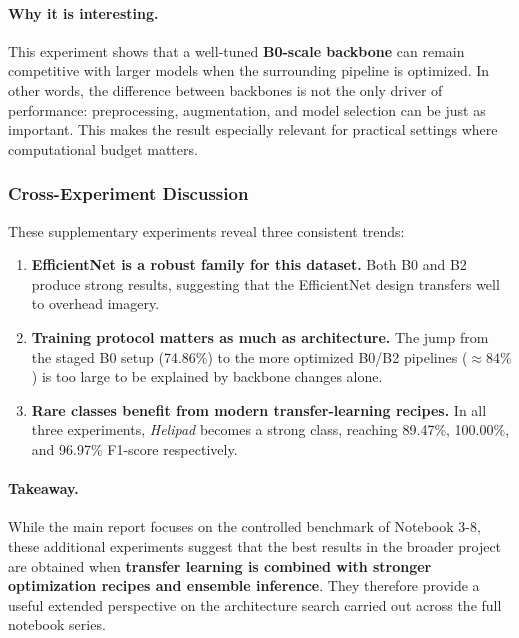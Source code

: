 \paragraph{Why it is interesting.} This experiment shows that a well-tuned \textbf{B0-scale backbone} can remain competitive with larger models when the surrounding pipeline is optimized. In other words, the difference between backbones is not the only driver of performance: preprocessing, augmentation, and model selection can be just as important. This makes the result especially relevant for practical settings where computational budget matters.

\subsubsection{Cross-Experiment Discussion}

These supplementary experiments reveal three consistent trends:
\begin{enumerate}
    \item \textbf{EfficientNet is a robust family for this dataset.} Both B0 and B2 produce strong results, suggesting that the EfficientNet design transfers well to overhead imagery.
    \item \textbf{Training protocol matters as much as architecture.} The jump from the staged B0 setup (74.86\%) to the more optimized B0/B2 pipelines ($\approx 84\%$) is too large to be explained by backbone changes alone.
    \item \textbf{Rare classes benefit from modern transfer-learning recipes.} In all three experiments, \textit{Helipad} becomes a strong class, reaching 89.47\%, 100.00\%, and 96.97\% F1-score respectively.
\end{enumerate}

\paragraph{Takeaway.} While the main report focuses on the controlled benchmark of Notebook 3-8, these additional experiments suggest that the best results in the broader project are obtained when \textbf{transfer learning is combined with stronger optimization recipes and ensemble inference}. They therefore provide a useful extended perspective on the architecture search carried out across the full notebook series.
